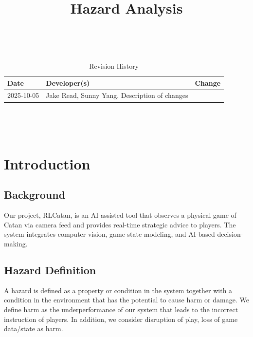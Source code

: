 \documentclass{article}
\title{Hazard Analysis\\\progname}
\author{\authname}
\date{}
\begin{document}
\maketitle
\thispagestyle{empty}

~\newpage


\begin{table}[hp]
\caption{Revision History} \label{TblRevisionHistory}
\begin{tabularx}{\textwidth}{llX}
\toprule
\textbf{Date} & \textbf{Developer(s)} & \textbf{Change}\\
\midrule
2025-10-05 & Jake Read, Sunny Yang, Description of changes\\

\bottomrule
\end{tabularx}
\end{table}

~\newpage

\tableofcontents
\listoftables
\listoffigures

~\newpage



\section{Introduction}\label{sec:introduction}


\subsection{Background}\label{subsec:background}
Our project, RLCatan, is an AI-assisted tool that observes a physical game of Catan via camera feed and provides real-time strategic advice to players.
The system integrates computer vision, game state modeling, and AI-based decision-making.

\subsection{Hazard Definition}\label{subsec:hazard-definition}
A hazard is defined as a property or condition in the system together
with a condition in the environment that has the potential to cause harm or
damage. We define harm as the underperformance of our system
that leads to the incorrect instruction of players. In addition, we consider
disruption of play, loss of game data/state as harm.
\end{document}
